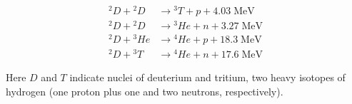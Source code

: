\begin{align}
 {}^2\si{D} + {}^2\si{D} &\rightarrow {}^3\si{T} + \si{p} + 4.03 \;\si{\mega\electronvolt}\label{eq:dd1}\\
 {}^2\si{D} + {}^2\si{D} &\rightarrow {}^{3}\si{He} + \si{n} + 3.27 \;\si{\mega\electronvolt}\label{eq:dd2}\\
 {}^2\si{D} + {}^3\si{He} &\rightarrow {}^4\si{He} + \si{p} + 18.3 \;\si{\mega\electronvolt}\label{eq:dhe3}\\
  {}^2\si{D} + {}^3\si{T} &\rightarrow {}^4\si{He} + \si{n} + 17.6 \;\si{\mega\electronvolt}\label{eq:dt}
\end{align}

\noindent Here $\si{D}$ and $\si{T}$ indicate nuclei of deuterium and tritium, two heavy isotopes of hydrogen (one proton plus one and two neutrons, respectively).

\begin{figure}[h]
 \pushtooutside
\end{figure}

\begin{figure}[h]
 \pushtooutside
\end{figure}

